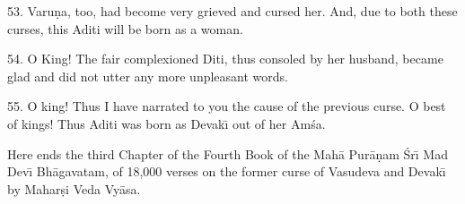 53. Varu\d{n}a, too, had become very grieved and cursed her. And, due to both these curses, this Aditi will be born as a woman.

54. O King! The fair complexioned Diti, thus consoled by her husband, became glad and did not utter any more unpleasant words.

55. O king! Thus I have narrated to you the cause of the previous curse. O best of kings! Thus Aditi was born as Devak\={\i} out of her Am\'sa.

Here ends the third Chapter of the Fourth Book of the Mah\=a Pur\=a\d{n}am \'Sr\={\i} Mad Dev\={\i} Bh\=agavatam, of 18,000 verses on the former curse of Vasudeva and Devak\={\i} by Mahar\d{s}i Veda Vy\=asa.



